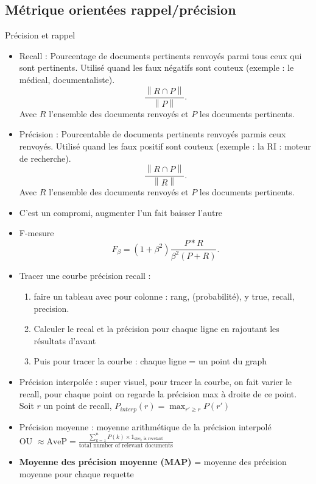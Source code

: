 \documentclass{article}
\theoremstyle{plain}%
\theoremstyle{definition}
\theoremstyle{remark}
\begin{document}
\subsection{Métrique orientées rappel/précision}
Précision et rappel
\begin{itemize}
    \item Recall : Pourcentage de documents pertinents renvoyés parmi tous ceux qui sont pertinents. Utilisé quand les faux négatifs sont couteux (exemple : le médical, documentaliste).
    \[
        \frac{\left\| R \cap P \right\| }{\left\| P \right\| }
    .\]
    Avec $ R $ l'ensemble des documents renvoyés et $ P $ les documents pertinents. 

    \item Précision : Pourcentable de documents pertinents renvoyés parmis ceux renvoyés. Utilisé quand les faux positif sont couteux (exemple : la RI : moteur de recherche).
    \[
        \frac{\left\| R \cap P \right\| }{\left\| R \right\| }
    .\]
    Avec $ R $ l'ensemble des documents renvoyés et $ P $ les documents pertinents.

    \item C'est un compromi, augmenter l'un fait baisser l'autre
    \item F-mesure 
    \[
        F_\beta = (1 + \beta ^2) \frac{P * R}{\beta ^2 (P+R)}
    .\]

    \item Tracer une courbe précision recall : \begin{enumerate}
        \item faire un tableau avec pour colonne : rang, (probabilité), y true, recall, precision.
        \item Calculer le recal et la précision pour chaque ligne en rajoutant les résultats d'avant
        \item Puis pour tracer la courbe : chaque ligne = un point du graph
    \end{enumerate}
    
    \item Précision interpolée : super visuel, pour tracer la courbe, on fait varier le recall, pour chaque point on regarde la précision max à droite de ce point. Soit $ r $  un point de recall, $ P_{interp}(r) = \max _{r' \geq r} P(r') $ 
    
    \item Précision moyenne : moyenne arithmétique de la précision interpolé \\
    OU $ \approx \text{AveP} = \frac{\sum_{k=1}^n P(k) \times {1}_{doc_k \text{ is revelant}}} {\text{total number of relevant documents}}$ 
    \item \textbf{Moyenne des précision moyenne (MAP)} = moyenne des précision moyenne pour chaque requette
    
\end{itemize}
\end{document}
